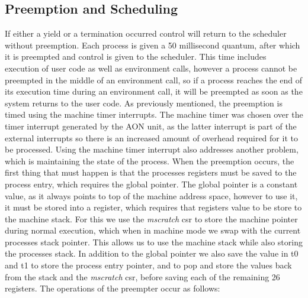 \subsection{Preemption and Scheduling}
If either a yield or a termination occurred control will return to the scheduler without preemption. Each process is given a 50 millisecond quantum, after which it is preempted and control is given to the scheduler. This time includes execution of user code as well as environment calls, however a process cannot be preempted in the middle of an environment call, so if a process reaches the end of its execution time during an environment call, it will be preempted as soon as the system returns to the user code. As previously mentioned, the preemption is timed using the machine timer interrupts. The machine timer was chosen over the timer interrupt generated by the AON unit, as the latter interrupt is part of the external interrupts so there is an increased amount of overhead required for it to be processed. Using the machine timer interrupt also addresses another problem, which is maintaining the state of the process. When the preemption occurs, the first thing that must happen is that the processes registers must be saved to the process entry, which requires the global pointer. The global pointer is a constant value, as it always points to top of the machine address space, however to use it, it must be stored into a register, which requires that registers value to be store to the machine stack. For this we use the \textit{mscratch} csr to store the machine pointer during normal execution, which when in machine mode we swap with the current processes stack pointer. This allows us to use the machine stack while also storing the processes stack. In addition to the global pointer we also save the value in t0 and t1 to store the process entry pointer, and to pop and store the values back from the stack and the \textit{mscratch} csr, before saving each of the remaining 26 registers. The operations of the preempter occur as follows:
